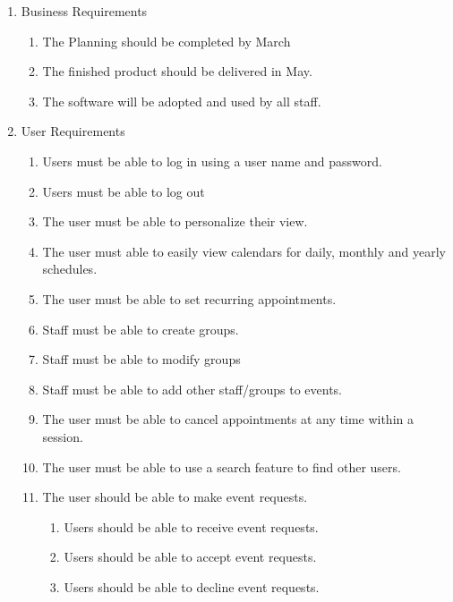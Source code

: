 \documentclass[a4paper]{article}
\begin{document}
\begin{enumerate}
  \item Business Requirements
  \begin{enumerate}[label=B\arabic*.]
    \item The Planning should be completed by March 
    \item The finished product should be delivered in May.
    \item The software will be adopted and used by all staff.
  \end{enumerate}

  \item User Requirements
  \begin{enumerate}[label=U\arabic*.] 
    \item Users must be able to log in using a user name and password.
    \item Users must be able to log out
    \item The user must be able to personalize their view.
    \item The user must able to easily view calendars for daily, monthly and yearly schedules.
    \item The user must be able to set recurring appointments.
    \item Staff must be able to create groups.
    \item Staff must be able to modify groups
    \item Staff must be able to add other staff/groups to events.
    \item The user must be able to cancel appointments at any time within a session.
    \item The user must be able to use a search feature to find other users.
    \item The user should be able to make event requests. 
    \begin{enumerate}[label*=\arabic*.]
      \item Users should be able to receive event requests.
      \item Users should be able to accept event requests.
      \item Users should be able to decline event requests.
    \end{enumerate}
  \end{enumerate}


\end{enumerate}
\end{document}
